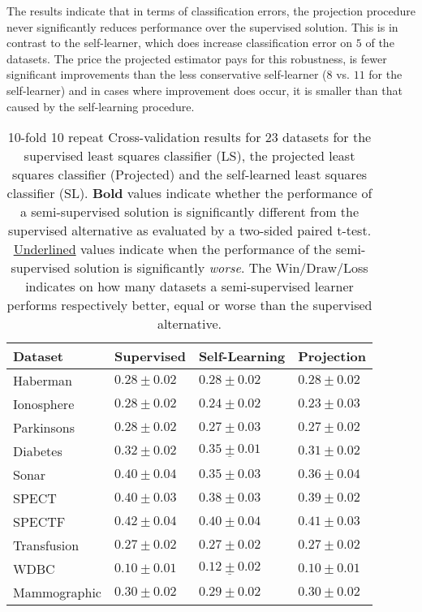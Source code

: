 \documentclass{article}
\begin{document}
The results indicate that in terms of classification errors, the projection procedure never significantly reduces performance over the supervised solution. This is in contrast to the self-learner, which does increase classification error on $5$ of the datasets. The price the projected estimator pays for this robustness, is fewer significant improvements than the less conservative self-learner ($8$ vs. $11$ for the self-learner) and in cases where improvement does occur, it is smaller than that caused by the self-learning procedure.

\begin{table*}[t]
\center
\caption{10-fold 10 repeat Cross-validation results for 23 datasets for the supervised least squares classifier (LS), the projected least squares classifier (Projected) and the self-learned least squares classifier (SL). \textbf{Bold} values indicate whether the performance of a semi-supervised solution is significantly different from the supervised alternative as evaluated by a two-sided paired t-test. \underline{Underlined} values indicate when the performance of the semi-supervised solution is significantly \emph{worse}. The Win/Draw/Loss indicates on how many datasets a semi-supervised learner performs respectively better, equal or worse than the supervised alternative.}
\smallskip
\smallskip
\smallskip
\begin{tabular}{|l|lll|}
\hline
Dataset & Supervised & Self-Learning & Projection \\ 
\hline
Haberman & $0.28 \pm 0.02$& $0.28 \pm 0.02$& $0.28 \pm 0.02$\\ 
Ionosphere & $0.28 \pm 0.02$& $\mathbf{0.24 \pm 0.02} $& $\mathbf{0.23 \pm 0.03} $\\ 
Parkinsons & $0.28 \pm 0.02$& $0.27 \pm 0.03$& $0.27 \pm 0.02$\\ 
Diabetes & $0.32 \pm 0.02$& $\mathbf{\underline{0.35 \pm 0.01}} $& $0.31 \pm 0.02$\\ 
Sonar & $0.40 \pm 0.04$& $\mathbf{0.35 \pm 0.03} $& $\mathbf{0.36 \pm 0.04} $\\ 
SPECT & $0.40 \pm 0.03$& $0.38 \pm 0.03$& $0.39 \pm 0.02$\\ 
SPECTF & $0.42 \pm 0.04$& $0.40 \pm 0.04$& $0.41 \pm 0.03$\\ 
Transfusion & $0.27 \pm 0.02$& $0.27 \pm 0.02$& $0.27 \pm 0.02$\\ 
WDBC & $0.10 \pm 0.01$& $\mathbf{\underline{0.12 \pm 0.02}} $& $0.10 \pm 0.01$\\ 
Mammographic & $0.30 \pm 0.02$& $0.29 \pm 0.02$& $0.30 \pm 0.02$\\ 

\end{tabular}
\end{table*}
\end{document}
